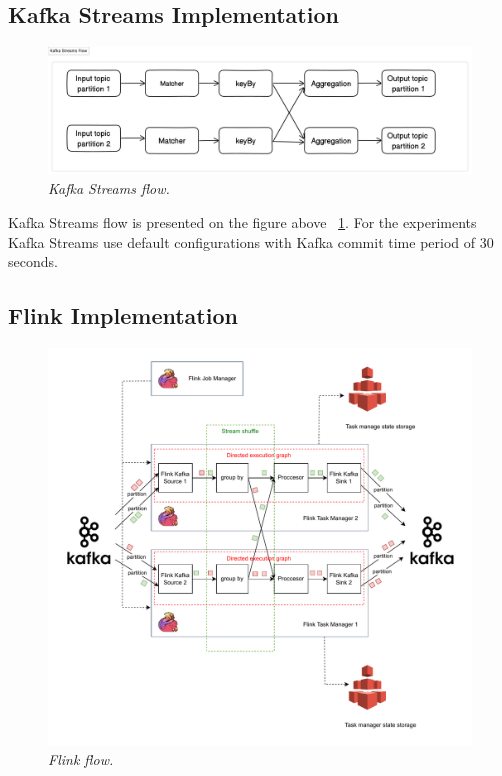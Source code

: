 \subsection{Kafka Streams Implementation}\label{subsec:kafka-streams-implementation}

\begin{figure}[H]
    \centering
    \includegraphics[width=1\textwidth]{figures/k-streams-shuffle}
    \caption{\textit{Kafka Streams flow.}}
    \label{fig:k-stream-shufle}
\end{figure}

Kafka Streams flow is presented on the figure above ~\ref{fig:k-stream-shufle}.
For the experiments Kafka Streams use default configurations with Kafka
commit time period of 30 seconds.


\subsection{Flink Implementation}\label{subsec:flink-implementation}

\begin{figure}[H]
    \centering
    \includegraphics[width=1\textwidth]{figures/flink-shuffle}
    \caption{\textit{Flink flow.}}
    \label{fig:flink-shuffle}
\end{figure}

